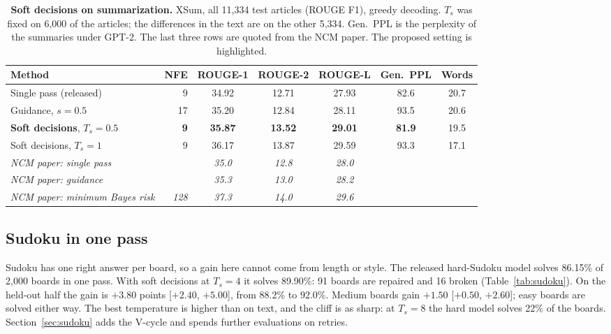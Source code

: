 \documentclass[11pt]{article}
\begin{document}
\begin{table}[t]
\centering
\small
\renewcommand{\arraystretch}{1.12}
\setlength{\tabcolsep}{6.5pt}
\begin{tabular}{@{}lrccccc@{}}
\toprule
Method & NFE & ROUGE-1 & ROUGE-2 & ROUGE-L & Gen.\ PPL & Words \\
\midrule
Single pass (released) & 9 & 34.92 & 12.71 & 27.93 & 82.6 & 20.7 \\
Guidance, $s{=}0.5$ & 17 & 35.20 & 12.84 & 28.11 & 93.5 & 20.6 \\
\rowcolor{oursrow} \textbf{Soft decisions}, $T_s{=}0.5$ & \textbf{9} & \textbf{35.87} & \textbf{13.52} & \textbf{29.01} & \textbf{81.9} & 19.5 \\
Soft decisions, $T_s{=}1$ & 9 & 36.17 & 13.87 & 29.59 & 93.3 & 17.1 \\
\midrule
\emph{NCM paper: single pass} & & \emph{35.0} & \emph{12.8} & \emph{28.0} & & \\
\emph{NCM paper: guidance} & & \emph{35.3} & \emph{13.0} & \emph{28.2} & & \\
\emph{NCM paper: minimum Bayes risk} & \emph{128} & \emph{37.3} & \emph{14.0} & \emph{29.6} & & \\
\bottomrule
\end{tabular}
\caption{\textbf{Soft decisions on summarization.} XSum, all 11,334 test articles (ROUGE F1), greedy decoding. $T_s$ was fixed on 6,000 of the articles; the
differences in the text are on the other 5,334. Gen.\ PPL is the perplexity of the summaries under GPT-2. The
last three rows are quoted from the NCM paper. The proposed setting is highlighted.}
\label{tab:xsum}
\end{table}

\subsection{Sudoku in one pass}

Sudoku has one right answer per board, so a gain here cannot come from length or style. The released hard-Sudoku model
solves 86.15\% of 2,000 boards in one pass. With soft decisions at $T_s=4$ it solves 89.90\%: 91 boards are repaired
and 16 broken (Table~\ref{tab:sudoku}). On the held-out half the gain is $+3.80$ points [$+2.40$, $+5.00$], from 88.2\%
to 92.0\%. Medium boards gain $+1.50$ [$+0.50$, $+2.60$]; easy boards are solved either way. The best temperature is
higher than on text, and the cliff is as sharp: at $T_s=8$ the hard model solves 22\% of the boards.
Section~\ref{sec:sudoku} adds the V-cycle and spends further evaluations on retries.
\end{document}

